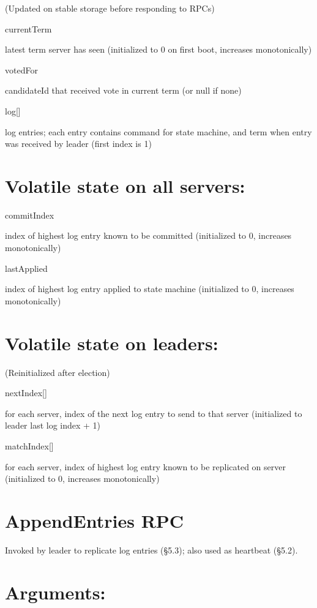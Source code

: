 \documentclass[
]{article}
\newcounter{none} %
\begin{document}
(Updated on stable storage before responding to RPCs)

currentTerm

latest term server has seen (initialized to 0 on first boot, increases
monotonically)

votedFor

candidateId that received vote in current term (or null if none)

log{[}{]}

log entries; each entry contains command for state machine, and term
when entry was received by leader (first index is 1)

\section{Volatile state on all
servers:}\label{volatile-state-on-all-servers}

commitIndex

index of highest log entry known to be committed (initialized to 0,
increases monotonically)

lastApplied

index of highest log entry applied to state machine (initialized to 0,
increases monotonically)

\section{Volatile state on leaders:}\label{volatile-state-on-leaders}

(Reinitialized after election)

nextIndex{[}{]}

for each server, index of the next log entry to send to that server
(initialized to leader last log index + 1)

matchIndex{[}{]}

for each server, index of highest log entry known to be replicated on
server (initialized to 0, increases monotonically)

\section{AppendEntries RPC}\label{appendentries-rpc}

Invoked by leader to replicate log entries (§5.3); also used as
heartbeat (§5.2).

\section{Arguments:}\label{arguments}
\end{document}

